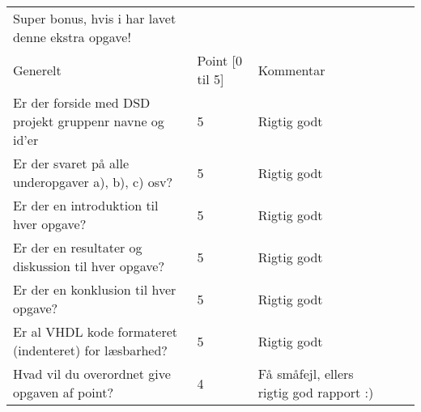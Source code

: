 \documentclass[../journal.tex]{subfiles}
\begin{document}
\begin{table}[p]
\begin{tabular}{lllll}
   Super bonus, hvis i har lavet denne ekstra opgave!                                                                                        &                                          &                                                        &                       &                       \\
   Generelt                                                                                                                                  & Point {[}0 til 5{]}                      & Kommentar                                              &                       &                       \\
   Er der forside med DSD projekt gruppenr navne og id'er                                                                                    & 5                                        & Rigtig godt                                            &                       &                       \\
   Er der svaret på alle underopgaver a), b), c) osv?                                                                                        & 5                                        & Rigtig godt                                            &                       &                       \\
   Er der en introduktion til hver opgave?                                                                                                   & 5                                        & Rigtig godt                                            &                       &                       \\
   Er der en resultater og diskussion til hver opgave?                                                                                       & 5                                        & Rigtig godt                                            &                       &                       \\
   Er der en konklusion til hver opgave?                                                                                                     & 5                                        & Rigtig godt                                            &                       &                       \\
   Er al VHDL kode formateret (indenteret) for læsbarhed?                                                                                    & 5                                        & Rigtig godt                                            &                       &                       \\
   Hvad vil du overordnet give opgaven af point?                                                                                             & 4                                        & Få småfejl, ellers rigtig god rapport :)               &                       &                      
   \end{tabular}
   \end{table}
\end{document}
